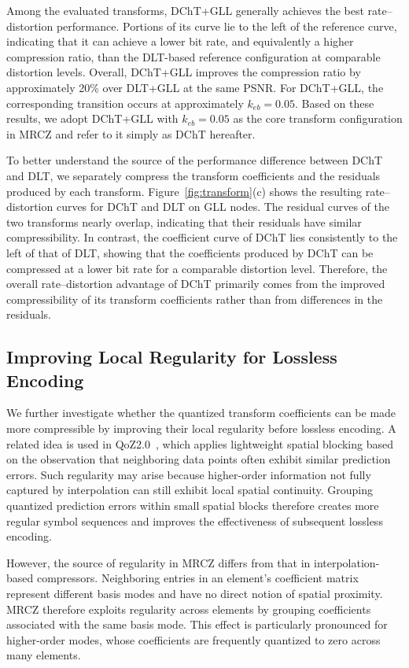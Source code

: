Among the evaluated transforms, DChT+GLL generally achieves the best rate--distortion performance. Portions of its curve lie to the left of the reference curve, indicating that it can achieve a lower bit rate, and equivalently a higher compression ratio, than the DLT-based reference configuration at comparable distortion levels. Overall, DChT+GLL improves the compression ratio by approximately 20\% over DLT+GLL at the same PSNR. For DChT+GLL, the corresponding transition occurs at approximately $k_{eb}=0.05$. Based on these results, we adopt DChT+GLL with $k_{eb}=0.05$ as the core transform configuration in MRCZ and refer to it simply as DChT hereafter.

To better understand the source of the performance difference between DChT and DLT, we separately compress the transform coefficients and the residuals produced by each transform. Figure~\ref{fig:transform}(c) shows the resulting rate--distortion curves for DChT and DLT on GLL nodes. The residual curves of the two transforms nearly overlap, indicating that their residuals have similar compressibility. In contrast, the coefficient curve of DChT lies consistently to the left of that of DLT, showing that the coefficients produced by DChT can be compressed at a lower bit rate for a comparable distortion level. Therefore, the overall rate--distortion advantage of DChT primarily comes from the improved compressibility of its transform coefficients rather than from differences in the residuals.

\subsection{Improving Local Regularity for Lossless Encoding}\label{sec:mrcz:transpose}

We further investigate whether the quantized transform coefficients can be made more compressible by improving their local regularity before lossless encoding. A related idea is used in QoZ2.0~\cite{liu2024high}, which applies lightweight spatial blocking based on the observation that neighboring data points often exhibit similar prediction errors. Such regularity may arise because higher-order information not fully captured by interpolation can still exhibit local spatial continuity. Grouping quantized prediction errors within small spatial blocks therefore creates more regular symbol sequences and improves the effectiveness of subsequent lossless encoding.

However, the source of regularity in MRCZ differs from that in interpolation-based compressors. Neighboring entries in an element's coefficient matrix represent different basis modes and have no direct notion of spatial proximity. MRCZ therefore exploits regularity across elements by grouping coefficients associated with the same basis mode. This effect is particularly pronounced for higher-order modes, whose coefficients are frequently quantized to zero across many elements.

